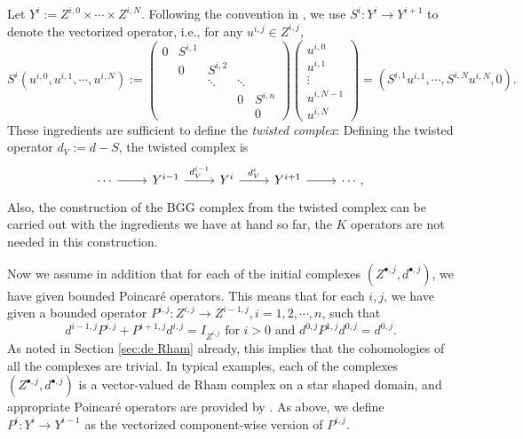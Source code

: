 \documentclass[11pt]{amsart}
\newcommand{\0}{\mathaccent23}
\newcommand{\bs}{{\scriptscriptstyle \bullet}}
\begin{document}
Let $Y^{i}:=Z^{i, 0}\times \cdots \times Z^{i, N}$. Following the convention in \cite{vcap2022bgg}, we use $S^{i}: Y^{i}\to Y^{i+1}$ to denote the vectorized operator, i.e., for any $u^{i, j}\in Z^{i, j}$,
 $$
 S^{i}(u^{i, 0}, u^{i, 1}, \cdots, u^{i, N}):=
 \left ( 
 \begin{array}{ccccc}
 0 & S^{i, 1} & &&\\
  &0 & S^{i, 2} & &\\
  & & \ddots &\ddots &\\
    &  &  &0 &S^{i, n} \\
  &  & & &0
 \end{array}
 \right )
 \left (
 \begin{array}{c}
 u^{i, 0}\\ u^{i, 1}\\ \vdots\\ u^{i, N-1} \\u^{i, N}
 \end{array}
 \right )
 = (S^{i, 1}u^{i, 1}, \cdots, S^{i, N}u^{i, N}, 0).
 $$
 These ingredients are sufficient to define the \textit{twisted complex}: Defining the twisted operator $d_{V}:=d-S$, the twisted complex is
 \begin{equation}\label{A-sequence-0}
\begin{tikzcd}
\cdots \arrow{r}{} &Y^{i-1} \arrow{r}{d_{V}^{i-1}} &Y^{i} \arrow{r}{d_{V}^{i}} & Y^{i+1}  \arrow{r}{} & \cdots,
 \end{tikzcd}
 \end{equation}
Also, the construction of the BGG complex from the twisted complex \cite{vcap2022bgg} can be carried out with the ingredients we have at hand so far, the $K$ operators are not needed in this construction. 

Now we assume in addition that for each of the initial complexes $(Z^{\bs,j},d^{\bs,j})$, we have given bounded Poincar\'e operators. This means that for each $i,j$, we have given a bounded operator $P^{i, j}: Z^{i, j}\to Z^{i-1, j}, i=1, 2, \cdots, n$, such that 
\begin{equation}\label{DPPD-input}
d^{i-1, j}P^{i, j}+P^{i+1, j}d^{i, j}=I_{Z^{i, j}}  \text{\ for\ }i>0\text{\ and\ }d^{0,j}P^{1,j}d^{0,j}=d^{0,j}.
\end{equation}
As noted in Section \ref{sec:de Rham} already, this implies that the cohomologies of all the complexes are trivial. In typical examples, each of the complexes $(Z^{\bs,j},d^{\bs,j})$ is a vector-valued de Rham complex on a star shaped domain, and appropriate Poincar\'e operators are provided by \cite{costabel2010bogovskiui}. As above, we define $P^{i}: Y^{i}\to Y^{i-1}$ as the vectorized component-wise version of $P^{i, j}$.
\end{document}
